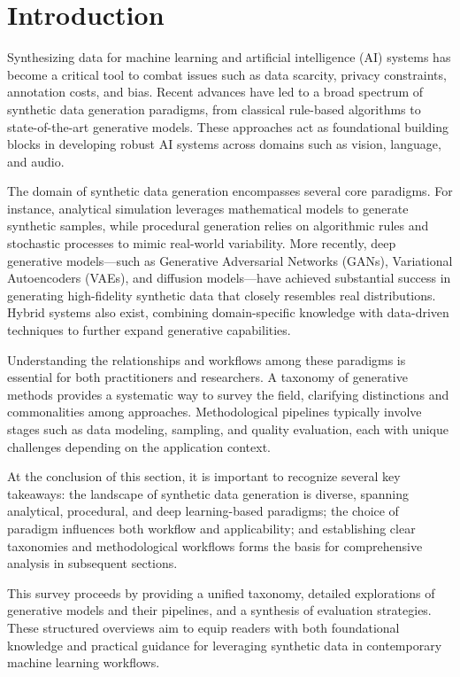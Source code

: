 \documentclass[sigconf]{acmart}
\begin{document}
\section{Introduction}

Synthesizing data for machine learning and artificial intelligence (AI) systems has become a critical tool to combat issues such as data scarcity, privacy constraints, annotation costs, and bias. Recent advances have led to a broad spectrum of synthetic data generation paradigms, from classical rule-based algorithms to state-of-the-art generative models. These approaches act as foundational building blocks in developing robust AI systems across domains such as vision, language, and audio.

The domain of synthetic data generation encompasses several core paradigms. For instance, analytical simulation leverages mathematical models to generate synthetic samples, while procedural generation relies on algorithmic rules and stochastic processes to mimic real-world variability. More recently, deep generative models—such as Generative Adversarial Networks (GANs), Variational Autoencoders (VAEs), and diffusion models—have achieved substantial success in generating high-fidelity synthetic data that closely resembles real distributions. Hybrid systems also exist, combining domain-specific knowledge with data-driven techniques to further expand generative capabilities.

Understanding the relationships and workflows among these paradigms is essential for both practitioners and researchers. A taxonomy of generative methods provides a systematic way to survey the field, clarifying distinctions and commonalities among approaches. Methodological pipelines typically involve stages such as data modeling, sampling, and quality evaluation, each with unique challenges depending on the application context.

At the conclusion of this section, it is important to recognize several key takeaways: the landscape of synthetic data generation is diverse, spanning analytical, procedural, and deep learning-based paradigms; the choice of paradigm influences both workflow and applicability; and establishing clear taxonomies and methodological workflows forms the basis for comprehensive analysis in subsequent sections.

This survey proceeds by providing a unified taxonomy, detailed explorations of generative models and their pipelines, and a synthesis of evaluation strategies. These structured overviews aim to equip readers with both foundational knowledge and practical guidance for leveraging synthetic data in contemporary machine learning workflows.
\end{document}

